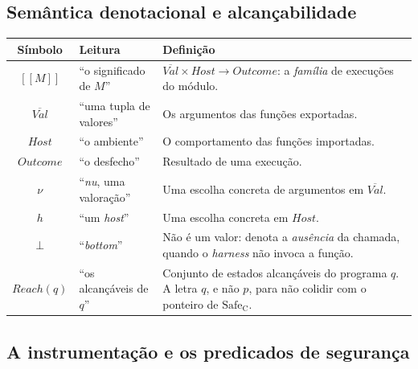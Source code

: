 \documentclass[11pt,a4paper]{article}
\theoremstyle{definition}
\newcommand{\sem}[1]{[\![#1]\!]}          %
\newcommand{\Safe}{\mathrm{Safe}}
\newcommand{\Reach}{\mathit{Reach}}
\begin{document}
\subsection{Semântica denotacional e alcançabilidade}

\begin{tabularx}{\textwidth}{@{}c l X@{}}
\toprule
\textbf{Símbolo} & \textbf{Leitura} & \textbf{Definição} \\
\midrule
$\sem{M}$ & ``o significado de $M$'' & $\overline{\mathit{Val}} \times \mathit{Host} \to \mathit{Outcome}$: a \emph{família} de execuções do módulo. \\
$\overline{\mathit{Val}}$ & ``uma tupla de valores'' & Os argumentos das funções exportadas. \\
$\mathit{Host}$ & ``o ambiente'' & O comportamento das funções importadas. \\
$\mathit{Outcome}$ & ``o desfecho'' & Resultado de uma execução. \\
$\nu$ & ``\emph{nu}, uma valoração'' & Uma escolha concreta de argumentos em $\overline{\mathit{Val}}$. \\
$h$ & ``um \emph{host}'' & Uma escolha concreta em $\mathit{Host}$. \\
$\bot$ & ``\emph{bottom}'' & Não é um valor: denota a \emph{ausência} da chamada, quando o \emph{harness} não invoca a função. \\
$\Reach(q)$ & ``os alcançáveis de $q$'' & Conjunto de estados alcançáveis do programa $q$. A letra $q$, e não $p$, para não colidir com o ponteiro de $\Safe_{\mathrm{C}}$. \\
\bottomrule
\end{tabularx}

\subsection{A instrumentação e os predicados de segurança}
\end{document}
